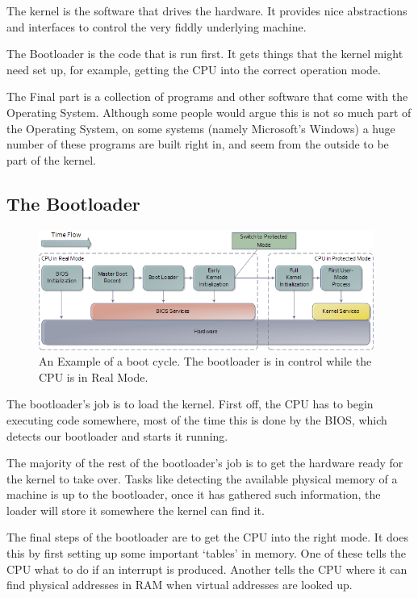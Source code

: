 \documentclass[a4paper]{report}
\begin{document}
The kernel is the software that drives the hardware. It provides nice abstractions and interfaces to control the very fiddly underlying machine.

The Bootloader is the code that is run first. It gets things that the kernel might need set up, for example, getting the CPU into the correct operation mode.

The Final part is a collection of programs and other software that come with the Operating System. Although some people would argue this is not so much part of the Operating System, on some systems (namely Microsoft's Windows) a huge number of these programs are built right in, and seem from the outside to be part of the kernel.

\subsection{The Bootloader}

\begin{figure}[ht]
\centering
\includegraphics[width=415px]{images/bootProcess.png}
\caption{An Example of a boot cycle. The bootloader is in control while the CPU is in Real Mode.}
\label{fig:theloader}
\end{figure}

The bootloader's job is to load the kernel. First off, the CPU has to begin executing code somewhere, most of the time this is done by the BIOS, which detects our bootloader and starts it running.

The majority of the rest of the bootloader's job is to get the hardware ready for the kernel to take over. Tasks like detecting the available physical memory of a machine is up to the bootloader, once it has gathered such information, the loader will store it somewhere the kernel can find it.

The final steps of the bootloader are to get the CPU into the right mode. It does this by first setting up some important `tables' in memory. One of these tells the CPU what to do if an interrupt is produced. Another tells the CPU where it can find physical addresses in RAM when virtual addresses are looked up.
\end{document}
